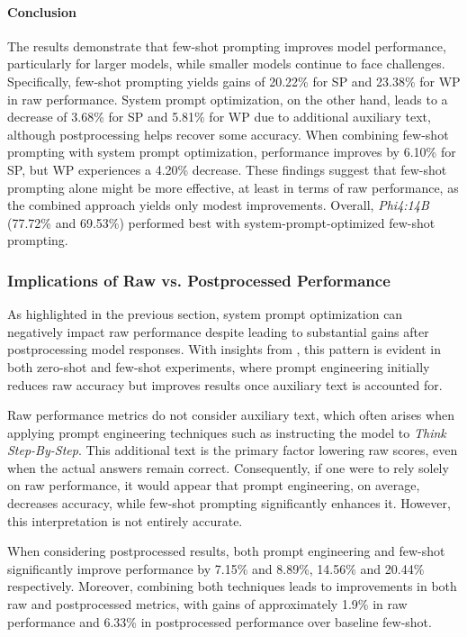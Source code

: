 \paragraph{Conclusion}

The results demonstrate that few-shot prompting improves model performance, particularly for larger models, while smaller models continue to face challenges. Specifically, few-shot prompting yields gains of 20.22\% for \acf{SP} and 23.38\% for \acf{WP} in raw performance. System prompt optimization, on the other hand, leads to a decrease of 3.68\% for \ac{SP} and 5.81\% for \ac{WP} due to additional auxiliary text, although postprocessing helps recover some accuracy. When combining few-shot prompting with system prompt optimization, performance improves by 6.10\% for \ac{SP}, but \ac{WP} experiences a 4.20\% decrease. These findings suggest that few-shot prompting alone might be more effective, at least in terms of raw performance, as the combined approach yields only modest improvements. Overall, \textit{Phi4:14B} (77.72\% and 69.53\%) performed best with system-prompt-optimized few-shot prompting.

\subsubsection{Implications of Raw vs. Postprocessed Performance}
\label{par:raw-vs-post-performance}

As highlighted in the previous section, system prompt optimization can negatively impact raw performance despite leading to substantial gains after postprocessing model responses. With insights from , this pattern is evident in both zero-shot and few-shot experiments, where prompt engineering initially reduces raw accuracy but improves results once auxiliary text is accounted for.

Raw performance metrics do not consider auxiliary text, which often arises when applying prompt engineering techniques such as instructing the model to \textit{Think Step-By-Step}. This additional text is the primary factor lowering raw scores, even when the actual answers remain correct. Consequently, if one were to rely solely on raw performance, it would appear that prompt engineering, on average, decreases accuracy, while few-shot prompting significantly enhances it. However, this interpretation is not entirely accurate.

When considering postprocessed results, both prompt engineering and few-shot significantly improve performance by 7.15\% and 8.89\%, 14.56\% and 20.44\% respectively. Moreover, combining both techniques leads to improvements in both raw and postprocessed metrics, with gains of approximately 1.9\% in raw performance and 6.33\% in postprocessed performance over baseline few-shot.

